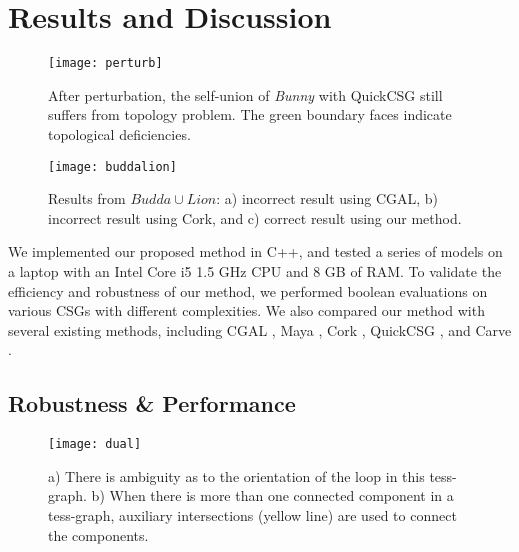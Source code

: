 \section{Results and Discussion}


\begin{figure}[t]
\centering
\texttt{[image: perturb]}
\caption{After perturbation, the self-union of \emph{Bunny} with QuickCSG still suffers from topology problem. The green boundary faces indicate topological deficiencies.}
%
\label{fig:boundaryedge}
\end{figure}

\begin{figure}[t]
\centering
\texttt{[image: buddalion]}
\caption{ Results from $Budda\cup Lion$: a) incorrect result using CGAL, b) incorrect result using Cork, and c) correct result using our method. }
\label{fig:buddalion}
\end{figure}


We implemented our proposed method in C++, and tested a series of models on a laptop with an Intel Core i5 1.5 GHz CPU and 8 GB of RAM. To validate the efficiency and robustness of our method, we performed boolean evaluations on various CSGs with different complexities. We also compared our method with several existing methods, including CGAL \cite{cgal:hk-bonp3-15a}, Maya \cite{Maya2015,barki2015exact}, Cork  \cite{Cork}, QuickCSG \cite{douze2015quickcsg}, and Carve \cite{Carve}.



\subsection{Robustness \& Performance}



\begin{figure}[t]
\centering
\texttt{[image: dual]}
\caption{a) There is ambiguity as to the orientation of the loop in this tess-graph. b) When there is more than one connected component in a tess-graph, auxiliary intersections (yellow line) are used to connect the components.}
\label{fig:dual}
\end{figure}



